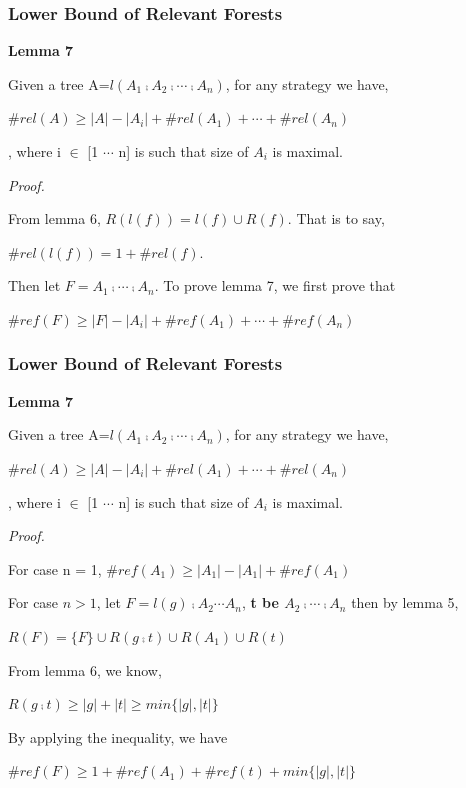\documentclass{beamer}
\begin{document}
\begin{frame}
\frametitle{Lower Bound of Relevant Forests}
\textbf{Lemma 7}

Given a tree A=$l(A_1 \comp A_2 \comp \cdots \comp A_n)$, for any strategy we have,

$\#rel(A) \geq \left\vert A \right\vert - \left\vert A_i \right\vert + \#rel(A_1) + \cdots + \#rel(A_n)$

, where i $\in$ [1 $\cdots$ n] is such that size of $A_i$ is maximal.

\vspace{12pt} 
\emph{Proof.}

From lemma 6, $R(l(f)) = {l(f)} \cup R(f)$. That is to say, 

$\#rel(l(f)) = 1 + \#rel(f)$.

\vspace{6pt} 
Then let $F=A_1 \comp \cdots \comp A_n$. To prove lemma 7, we first prove that 

$\#ref(F) \geq \left\vert F \right\vert - \left\vert A_i \right\vert + \#ref(A_1) + \cdots + \#ref(A_n)$
\end{frame}

\begin{frame}
\frametitle{Lower Bound of Relevant Forests}
\textbf{Lemma 7}

Given a tree A=$l(A_1 \comp A_2 \comp \cdots \comp A_n)$, for any strategy we have,

$\#rel(A) \geq \left\vert A \right\vert - \left\vert A_i \right\vert + \#rel(A_1) + \cdots + \#rel(A_n)$

, where i $\in$ [1 $\cdots$ n] is such that size of $A_i$ is maximal.

\vspace{12pt} 
\emph{Proof.}

For case n = 1, $\#ref(A_1) \geq \left\vert A_1 \right\vert - \left\vert A_1 \right\vert + \#ref(A_1)$

\vspace{6pt} 
For case $n > 1$, let \textbf{$F = l(g) \comp A_2 \cdots A_n$}, \textbf{t be $A_2 \comp \cdots \comp A_n$} then by lemma 5,

$R(F) = \{F\} \cup R(g \comp t) \cup R(A_1) \cup R(t)$

From lemma 6, we know,

$R(g \comp t) \geq \left\vert g \right\vert + \left\vert t \right\vert \geq min\{\left\vert g \right\vert, \left\vert t \right\vert \}$

By applying the inequality, we have    

$\#ref(F) \geq 1 + \#ref(A_1) + \#ref(t) + min\{\left\vert g \right\vert, \left\vert t \right\vert \}$
\end{frame}
\end{document}
